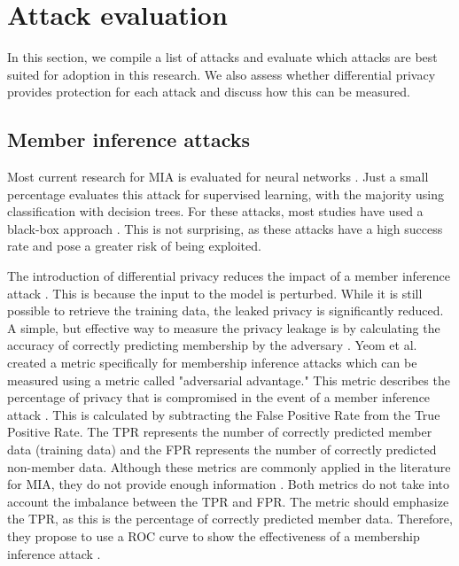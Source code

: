 



\section{Attack evaluation} \label{theory:attack-evaluation}
In this section, we compile a list of attacks and evaluate which attacks are best suited for adoption in this research.
We also assess whether differential privacy provides protection for each attack and discuss how this can be measured.
\subsection{Member inference attacks}
Most current research for MIA is evaluated for neural networks \citep{rigaki_survey_2021}.
Just a small percentage evaluates this attack for supervised learning, with the majority using classification with decision trees.
For these attacks, most studies have used a black-box approach \citep{rigaki_survey_2021}.
This is not surprising, as these attacks have a high success rate and pose a greater risk of being exploited.

The introduction of differential privacy reduces the impact of a member inference attack \citep{rigaki_survey_2021,hu_membership_2022}.
This is because the input to the model is perturbed. While it is still possible to retrieve the training data, the leaked privacy is significantly reduced.
A simple, but effective way to measure the privacy leakage is by calculating the accuracy of correctly predicting membership by the adversary \citep{choquette-choo_label-only_2021}.
Yeom et al. created a metric specifically for membership inference attacks which can be measured using a metric called "adversarial advantage."
This metric describes the percentage of privacy that is compromised in the event of a member inference attack \citep{yeom_privacy_2018}.
This is calculated by subtracting the False Positive Rate from the True Positive Rate.
The TPR represents the number of correctly predicted member data (training data) and the FPR represents the number of correctly predicted non-member data.
Although these metrics are commonly applied in the literature for MIA, they do not provide enough information \citep{carlini_membership_2022}.
Both metrics do not take into account the imbalance between the TPR and FPR.
The metric should emphasize the TPR, as this is the percentage of correctly predicted member data.
Therefore, they propose to use a ROC curve to show the effectiveness of a membership inference attack \citep{carlini_membership_2022}. \newline

